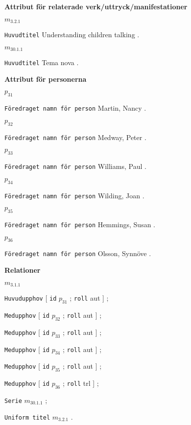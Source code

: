 \documentclass[a4,12pt]{article}
\begin{document}
\textbf{Attribut för relaterade verk/uttryck/manifestationer}

\noindent $m_{3.2.1}$

  \texttt{Huvudtitel} Understanding children talking .

\noindent $m_{30.1.1}$

  \texttt{Huvudtitel} Tema nova .



\vspace{3mm}

\textbf{Attribut för personerna}

\noindent $p_{31}$

  \texttt{Föredraget namn för person} Martin, Nancy .

\noindent $p_{32}$

  \texttt{Föredraget namn för person} Medway, Peter .

\noindent $p_{33}$

  \texttt{Föredraget namn för person} Williams, Paul .

\noindent $p_{34}$

  \texttt{Föredraget namn för person} Wilding, Joan .

\noindent $p_{35}$

  \texttt{Föredraget namn för person} Hemmings, Susan .
  
  \noindent $p_{36}$

  \texttt{Föredraget namn för person} Olsson, Synnöve .



\vspace{3mm}

\textbf{Relationer}

\noindent $m_{3.1.1}$

\texttt{Huvudupphov} [ \texttt{id}  $p_{31}$ ; \texttt{roll}  aut ] ;

\texttt{Medupphov} [ \texttt{id}  $p_{32}$ ; \texttt{roll}  aut ] ;

\texttt{Medupphov} [ \texttt{id}  $p_{33}$ ; \texttt{roll}  aut ] ;

\texttt{Medupphov} [ \texttt{id}  $p_{34}$ ; \texttt{roll}  aut ] ;

\texttt{Medupphov} [ \texttt{id}  $p_{35}$ ; \texttt{roll}  aut ] ;

\texttt{Medupphov} [ \texttt{id}  $p_{36}$ ; \texttt{roll}  trl ] ;

\texttt{Serie}  $m_{30.1.1}$ ;

\texttt{Uniform titel} $m_{3.2.1}$ .
\end{document}
